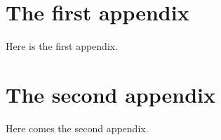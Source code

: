 \begin{appendix}


\chapter{The first appendix}

Here is the first appendix.


\chapter{The second appendix}

Here comes the second appendix.


\end{appendix}
